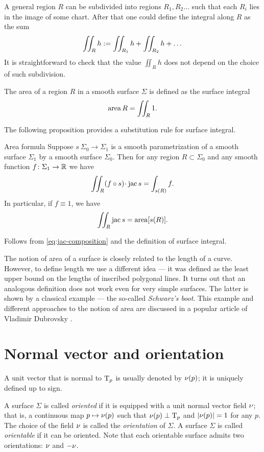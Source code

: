 A general region $R$ can be subdivided into regions $R_1,R_2\dots$ such that each $R_i$ lies in the image of some chart.
After that one could define the integral along $R$ as the sum
\[\iint_Rh
\mathrel{:=}
\iint_{R_1}h+\iint_{R_2}h+\dots\]
It is straightforward to check that the value $\iint_Rh$ does not depend on the choice of such subdivision.

The area of a region $R$ in a smooth surface $\Sigma$ is defined as the surface integral 
\[\mathop{\rm area}\nolimits R=\iint_R 1.\]

The following proposition provides a substitution rule for surface integral.

\begin{thm}{Area formula}\label{prop:surface-integral}
Suppose $ s\:\Sigma_0\to \Sigma_1$ is a smooth parametrization of a smooth surface $\Sigma_1$ by  a smooth surface $\Sigma_0$.
Then for any region $R\subset \Sigma_0$ and any smooth function $f\colon\Sigma_1\to\mathbb{R}$ we have
\[\iint_R (f\circ s)\cdot \jac  s=\int_{ s(R)}f.\]
In particular, if $f\equiv 1$, we have
\[\iint_R \mathop{\rm jac}\nolimits  s=\mathop{\rm area}\nolimits [ s(R)].\]

\end{thm}

Follows from \ref{eq:jac-composition} and the definition of surface integral.
\qeds

The notion of area of a surface is closely related to the length of a curve.
However, to define length we use a different idea --- it was defined as the least upper bound on the lengths of inscribed polygonal lines.
It turns out that an analogous definition does not work even for very simple surfaces.
The latter is shown by a classical example --- the so-called \emph{Schwarz's boot}.
This example and different approaches to the notion of area are discussed in a popular article of Vladimir Dubrovsky \cite{dubrovsky}.

\section{Normal vector and orientation}
A unit vector that is normal to $\mathrm{T}_p$ is usually denoted by $\nu(p)$;
it is uniquely defined up to sign.

A surface $\Sigma$ is called \emph{oriented} if it is equipped with a unit normal vector field $\nu$;
that is, a continuous map $p\mapsto \nu(p)$ such that $\nu(p)\perp\mathrm{T}_p$ and $|\nu(p)|=1$ for any $p$.
The choice of the field $\nu$ is called the {}\emph{orientation} of $\Sigma$.
A surface $\Sigma$ is called {}\emph{orientable} if it can be oriented.
Note that each orientable surface admits two orientations: $\nu$ and $-\nu$.


